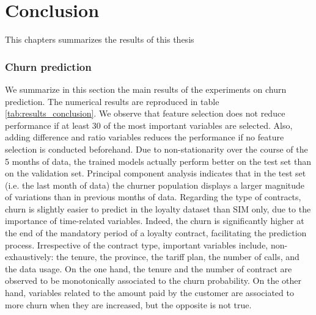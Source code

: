 \chapter{Conclusion}

This chapters summarizes the results of this thesis

\subsection{Churn prediction}

We summarize in this section the main results of the experiments on churn
prediction. The numerical results are reproduced in table
\ref{tab:results_conclusion}. We observe that feature selection does not reduce
performance if at least 30 of the most important variables are selected. Also,
adding difference and ratio variables reduces the performance if no feature
selection is conducted beforehand. Due to non-stationarity over the course of
the 5 months of data, the trained models actually perform better on the test set
than on the validation set. Principal component analysis indicates that in the
test set (i.e. the last month of data) the churner population displays a larger
magnitude of variations than in previous months of data. Regarding the type of
contracts, churn is slightly easier to predict in the loyalty dataset than SIM
only, due to the importance of time-related variables. Indeed, the churn is
significantly higher at the end of the mandatory period of a loyalty contract,
facilitating the prediction process. Irrespective of the contract type,
important variables include, non-exhaustively: the tenure, the province, the
tariff plan, the number of calls, and the data usage. On the one hand, the
tenure and the number of contract are observed to be monotonically associated to
the churn probability. On the other hand, variables related to the amount paid
by the customer are associated to more churn when they are increased, but the
opposite is not true.

